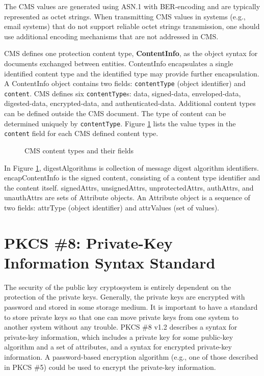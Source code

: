 \documentclass{article}
\begin{document}
The CMS values are generated using ASN.1 with BER-encoding and are 
typically represented as octet strings. When transmitting 
CMS values in systems (e.g., email systems) that do not support 
reliable octet strings transmission, one should use additional
encoding mechanisms that are not addressed in CMS.

CMS defines one protection content type, {\bf ContentInfo},
as the object syntax for documents exchanged between entities. 
ContentInfo encapsulates a single identified content type and the
identified type may provide further encapsulation. A
ContentInfo object contains two fields:
{\tt contentType} (object identifier) and {\tt content}.
CMS defines six {\tt contentType}s: 
data, signed-data, enveloped-data, digested-data, encrypted-data, 
and authenticated-data.  Additional content types can be defined 
outside the CMS document. The type of content can be
determined uniquely by {\tt contentType}. Figure \ref{pkcs7contenttype}
lists the value types in the {\tt content} field for each CMS defined 
content type.
\begin{center}
\begin{figure}[htb]
\caption{CMS content types and their fields}
\label{pkcs7contenttype}
\end{figure}
\end{center}
In Figure \ref{pkcs7contenttype},  digestAlgorithms is collection 
of message digest algorithm identifiers. encapContentInfo is the 
signed content, consisting of a content
type identifier and the content itself.
signedAttrs, unsignedAttrs, unprotectedAttrs, authAttrs, and unauthAttrs
are sets of Attribute objects. An Attribute object
is a sequence of two fields: attrType (object identifier) and
attrValues (set of values).

\section{PKCS \#8: Private-Key Information Syntax Standard}
\label{pkcs8}
The security of the public key cryptosystem is entirely dependent
on the protection of the private keys. Generally, the private keys
are encrypted with password and stored in some storage medium.
It is important to have a standard to store private keys
so that one can move private keys from one system to another system
without any trouble.
PKCS \#8 v1.2 describes a syntax for private-key information,
which includes a private key for some public-key algorithm and 
a set of attributes, and a syntax for encrypted private-key information. 
A password-based encryption algorithm 
(e.g., one of those described in PKCS \#5) could be used to encrypt 
the private-key information.
\end{document}
